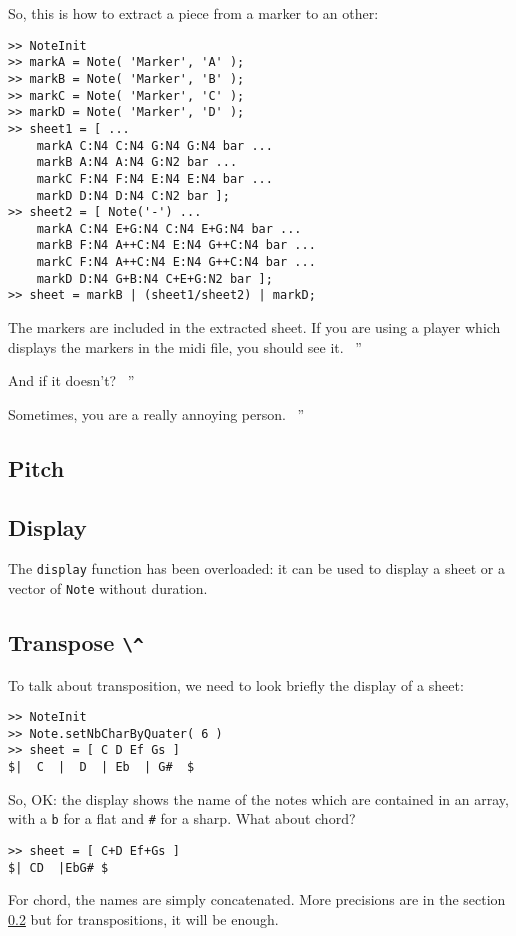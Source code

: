\documentclass{article}
\newenvironment{meenv}{ \par \noindent \makebox[6em][r]{ \textcolor{mecolor}{Me}: `` --~}}{~''}
\newenvironment{myselfenv}{ \par \noindent \makebox[6em][r]{ \textcolor{myselfcolor}{Myself}: `` --~}}{~''}
\newcommand{ \me }[1]{%
\begin{meenv}%
	#1%
\end{meenv} }
\newcommand{ \myself }[1]{%
\begin{myselfenv}%
	#1%
\end{myselfenv} }
\begin{document}
So, this is how to extract a piece from a marker to an other:

\begin{lstlisting}
>> NoteInit
>> markA = Note( 'Marker', 'A' );
>> markB = Note( 'Marker', 'B' );
>> markC = Note( 'Marker', 'C' );
>> markD = Note( 'Marker', 'D' );
>> sheet1 = [ ...
	markA C:N4 C:N4 G:N4 G:N4 bar ...
	markB A:N4 A:N4 G:N2 bar ...
	markC F:N4 F:N4 E:N4 E:N4 bar ...
	markD D:N4 D:N4 C:N2 bar ];
>> sheet2 = [ Note('-') ...
	markA C:N4 E+G:N4 C:N4 E+G:N4 bar ...
	markB F:N4 A++C:N4 E:N4 G++C:N4 bar ...
	markC F:N4 A++C:N4 E:N4 G++C:N4 bar ...
	markD D:N4 G+B:N4 C+E+G:N2 bar ];
>> sheet = markB | (sheet1/sheet2) | markD;
\end{lstlisting}

\myself{The markers are included in the extracted sheet. If you are using a player which displays the markers in the midi file, you should see it.}
\me{And if it doesn't?}
\myself{Sometimes, you are a really annoying person.}

\subsection{Pitch}
\label{sec:Pitch}

\subsection{Display}
\label{sec:Display}

The \lstinline!display! function has been overloaded: it can be used to display a sheet or a vector of \lstinline!Note! without duration.

\subsection{Transpose \lstinline!\^!}
\label{sec:Transpose}

To talk about transposition, we need to look briefly the display of a sheet:
\begin{lstlisting}
>> NoteInit
>> Note.setNbCharByQuater( 6 )
>> sheet = [ C D Ef Gs ]
$|  C  |  D  | Eb  | G#  $
\end{lstlisting}
So, OK: the display shows the name of the notes which are contained in an array, with a \lstinline!b! for a flat and \lstinline!#! for a sharp. What about chord?
\begin{lstlisting}
>> sheet = [ C+D Ef+Gs ]
$| CD  |EbG# $
\end{lstlisting}
For chord, the names are simply concatenated. More precisions are in the section \ref{sec:Display} but for transpositions, it will be enough.
\end{document}
